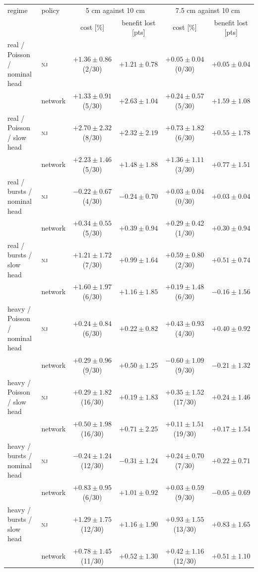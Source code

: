 \begin{tabular}{@{}llcccc@{}}
\toprule
regime & policy & \multicolumn{2}{c}{5 cm against 10 cm} & \multicolumn{2}{c}{7.5 cm against 10 cm} \\
 & & cost [\%] & benefit lost [pts] & cost [\%] & benefit lost [pts] \\
\midrule
real / Poisson / nominal head & \textsc{nj} & {\boldmath$+1.36 \pm 0.86$} (2/30) & {\boldmath$+1.21 \pm 0.78$} & {\boldmath$+0.05 \pm 0.04$} (0/30) & {\boldmath$+0.05 \pm 0.04$} \\
 & network & {\boldmath$+1.33 \pm 0.91$} (5/30) & {\boldmath$+2.63 \pm 1.04$} & $+0.24 \pm 0.57$ (5/30) & {\boldmath$+1.59 \pm 1.08$} \\
real / Poisson / slow head & \textsc{nj} & {\boldmath$+2.70 \pm 2.32$} (8/30) & {\boldmath$+2.32 \pm 2.19$} & $+0.73 \pm 1.82$ (6/30) & $+0.55 \pm 1.78$ \\
 & network & {\boldmath$+2.23 \pm 1.46$} (5/30) & $+1.48 \pm 1.88$ & {\boldmath$+1.36 \pm 1.11$} (3/30) & $+0.77 \pm 1.51$ \\
real / bursts / nominal head & \textsc{nj} & $-0.22 \pm 0.67$ (4/30) & $-0.24 \pm 0.70$ & $+0.03 \pm 0.04$ (0/30) & $+0.03 \pm 0.04$ \\
 & network & $+0.34 \pm 0.55$ (5/30) & $+0.39 \pm 0.94$ & $+0.29 \pm 0.42$ (1/30) & $+0.30 \pm 0.94$ \\
real / bursts / slow head & \textsc{nj} & $+1.21 \pm 1.72$ (7/30) & $+0.99 \pm 1.64$ & $+0.59 \pm 0.80$ (2/30) & $+0.51 \pm 0.74$ \\
 & network & $+1.60 \pm 1.97$ (6/30) & $+1.16 \pm 1.85$ & $+0.19 \pm 1.48$ (6/30) & $-0.16 \pm 1.56$ \\
\midrule
heavy / Poisson / nominal head & \textsc{nj} & $+0.24 \pm 0.84$ (6/30) & $+0.22 \pm 0.82$ & $+0.43 \pm 0.93$ (4/30) & $+0.40 \pm 0.92$ \\
 & network & $+0.29 \pm 0.96$ (9/30) & $+0.50 \pm 1.25$ & $-0.60 \pm 1.09$ (9/30) & $-0.21 \pm 1.32$ \\
heavy / Poisson / slow head & \textsc{nj} & $+0.29 \pm 1.82$ (16/30) & $+0.19 \pm 1.83$ & $+0.35 \pm 1.52$ (17/30) & $+0.24 \pm 1.46$ \\
 & network & $+0.50 \pm 1.98$ (16/30) & $+0.71 \pm 2.25$ & $+0.11 \pm 1.51$ (19/30) & $+0.17 \pm 1.54$ \\
heavy / bursts / nominal head & \textsc{nj} & $-0.24 \pm 1.24$ (12/30) & $-0.31 \pm 1.24$ & $+0.24 \pm 0.70$ (7/30) & $+0.22 \pm 0.71$ \\
 & network & $+0.83 \pm 0.95$ (6/30) & {\boldmath$+1.01 \pm 0.92$} & $+0.03 \pm 0.59$ (9/30) & $-0.05 \pm 0.69$ \\
heavy / bursts / slow head & \textsc{nj} & $+1.29 \pm 1.75$ (12/30) & $+1.16 \pm 1.90$ & $+0.93 \pm 1.55$ (13/30) & $+0.83 \pm 1.65$ \\
 & network & $+0.78 \pm 1.45$ (11/30) & $+0.52 \pm 1.30$ & $+0.42 \pm 1.16$ (12/30) & $+0.51 \pm 1.10$ \\
\bottomrule
\end{tabular}
